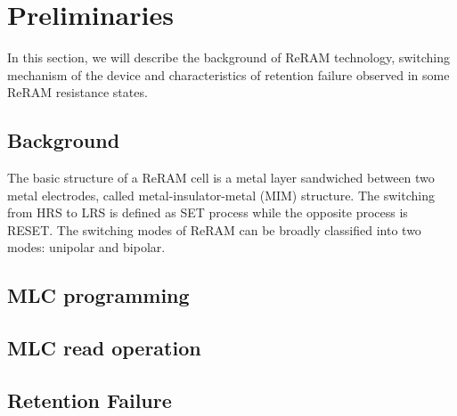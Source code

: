 \section{Preliminaries} \label{sec:preliminary}

In this section, we will describe the background of ReRAM technology, switching mechanism of the device and characteristics of retention failure observed in some ReRAM resistance states.

\subsection{Background}
The basic structure of a ReRAM cell is a metal layer sandwiched between two metal electrodes, called metal-insulator-metal (MIM) structure. The switching from HRS to LRS is defined as SET process while the opposite process is RESET. The switching modes of ReRAM can be broadly classified into two modes: unipolar and bipolar.
\subsection{MLC programming}

\subsection{MLC read operation}

\subsection{Retention Failure}

